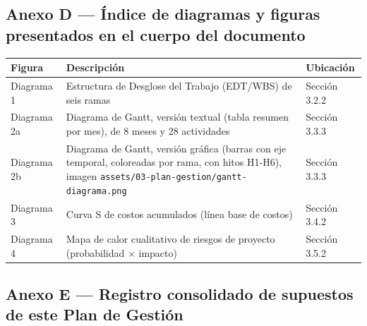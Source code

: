 \documentclass[11pt,a4paper]{article}
\begin{document}
\subsection{Anexo D --- Índice de diagramas y figuras presentados en el cuerpo del documento}\label{anexo-d-uxedndice-de-diagramas-y-figuras-presentados-en-el-cuerpo-del-documento}

{\small
\begin{longtable}[]{@{}
  >{\raggedright\arraybackslash}p{}
  >{\raggedright\arraybackslash}p{}
  >{\raggedright\arraybackslash}p{}@{}}
\toprule\noalign{}
\begin{minipage}[b]{\linewidth}\raggedright
Figura
\end{minipage} & \begin{minipage}[b]{\linewidth}\raggedright
Descripción
\end{minipage} & \begin{minipage}[b]{\linewidth}\raggedright
Ubicación
\end{minipage} \\
\midrule\noalign{}
\endhead
\bottomrule\noalign{}
\endlastfoot
Diagrama 1 & Estructura de Desglose del Trabajo (EDT/WBS) de seis ramas & Sección 3.2.2 \\
Diagrama 2a & Diagrama de Gantt, versión textual (tabla resumen por mes), de 8 meses y 28 actividades & Sección 3.3.3 \\
Diagrama 2b & Diagrama de Gantt, versión gráfica (barras con eje temporal, coloreadas por rama, con hitos H1-H6), imagen \texttt{assets/03-plan-gestion/gantt-diagrama.png} & Sección 3.3.3 \\
Diagrama 3 & Curva S de costos acumulados (línea base de costos) & Sección 3.4.2 \\
Diagrama 4 & Mapa de calor cualitativo de riesgos de proyecto (probabilidad × impacto) & Sección 3.5.2 \\
\end{longtable}
}

\subsection{Anexo E --- Registro consolidado de supuestos de este Plan de Gestión}\label{anexo-e-registro-consolidado-de-supuestos-de-este-plan-de-gestiuxf3n}
\end{document}
